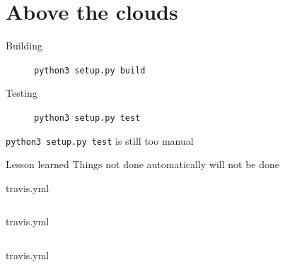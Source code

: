 \documentclass[pdf]{beamer}
\begin{document}
\section{Above the clouds}

\begin{frame}[fragile]
    \begin{description}
        \item [Building] \verb|python3 setup.py build|
        \item [Testing]  \verb|python3 setup.py test|
    \end{description}
\end{frame}

\begin{frame}[fragile]
    \verb|python3 setup.py test| is still too manual
\end{frame}

\begin{frame}
    \begin{block}{Lesson learned}
        Things not done automatically will not be done
    \end{block}

\end{frame}

\begin{frame}[fragile]{travis.yml}
    \inputminted[lastline = 12]{yaml}{travis.yml}
\end{frame}

\begin{frame}[fragile]{travis.yml}
    \inputminted[firstline = 16, lastline = 25]{yaml}{travis.yml}
\end{frame}

\begin{frame}[fragile]{travis.yml}
    \inputminted[firstline = 27, lastline = 42]{yaml}{travis.yml}
\end{frame}
\end{document}
